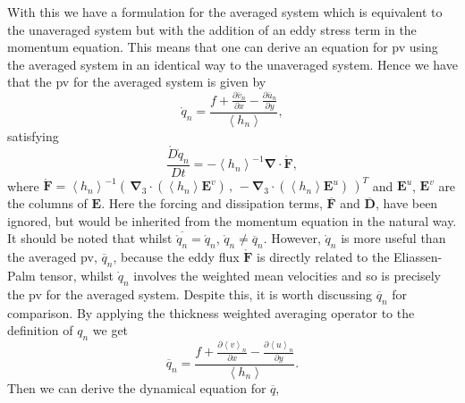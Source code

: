 \documentclass[12pt,a4paper]{report}
\newcommand*\thkmean[1]{\overline{#1}}
\newcommand*\nthkmean[1]{\left\langle{#1}\right\rangle}
\newcommand*\spec[1]{\mathring{#1}}
\newcommand*{\partialdiff}[2][{}]{\frac{\partial #1}{\partial #2}}
\begin{document}
    With this we have a formulation for the 
    averaged system which is equivalent to the
    unaveraged system but with the addition of an
    eddy stress term in the momentum equation.
    This means that one can derive an equation for \gls{pv} using the averaged system
    in an identical way to the unaveraged 
    system. Hence we have that the \gls{pv} for
    the averaged system is given by 
    \begin{equation}
    \spec{q}_{n} =
    \frac{f+\partialdiff[\thkmean{v}_{n}]{x}-\partialdiff[\thkmean{u}_{n}]{y}}
    {\nthkmean{h_{n}}},
    \end{equation} 
    satisfying
    \begin{equation}
    \frac{\spec{D}\spec{q}_{n}}{D t} 
    =   -\nthkmean{h_{n}}^{-1}
    \boldsymbol{\nabla}
    \cdot\boldsymbol{\spec{F}},
    \label{avpveq}
    \end{equation} 
    where $
    \boldsymbol{\spec{F}}
    =   \nthkmean{h_{n}}^{-1}\left( \,
    \boldsymbol{\nabla}_{3}
    \cdot(\nthkmean{h_{n}}
    \boldsymbol{E}^{v}) \, , \,
    - \boldsymbol{\nabla}_{3}
    \cdot(\nthkmean{h_{n}}
    \boldsymbol{E}^{u}) \, \right)^{T}  $ and $\boldsymbol{E}^{u}$,  $\boldsymbol{E}^{v}$ are the
    columns of  $\boldsymbol{E}$. Here the forcing and dissipation terms, $\thkmean{
    	\boldsymbol{F}}$ and $\thkmean{
    	\boldsymbol{D}}$, have been ignored, but
    would be inherited from the momentum
    equation in the natural way. It should be noted that whilst $\thkmean{\spec{q}_{n}} = \spec{q}_{n}$, $\spec{q}_{n} \neq \thkmean{q}_{n}$.  However,
    $\spec{q}_{n}$ is 
    more useful than the averaged \gls{pv}, $\thkmean{q}_{n}$, because the eddy flux $
    \boldsymbol{\spec{F}} $ is directly related to the Eliassen-Palm tensor, whilst  $\spec{q}_{n}$ involves
    the weighted mean velocities and so is precisely the \gls{pv} for the averaged system. 
    Despite this, it is worth discussing $\thkmean{q}_{n}$ for 
    comparison. By applying the thickness weighted averaging operator to the 
    definition of $q_{n}$ we get 
    \begin{equation}
    \thkmean{q}_{n} =
    \frac{f+\partialdiff[\nthkmean{v}_{n}]{x}-\partialdiff[\nthkmean{u}_{n}]{y}}
    {\nthkmean{h_{n}}}.
    \end{equation} 
    Then we can derive the dynamical equation for
    $ \thkmean{q}$,
\end{document}
